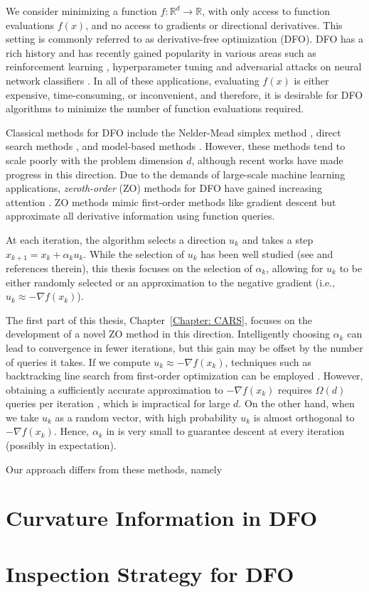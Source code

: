 We consider minimizing a function $f: \mathbb{R}^{d}\to \mathbb{R}$, with only access to function evaluations $f(x)$, and no access to gradients or directional derivatives. This setting is commonly referred to as derivative-free optimization (DFO). DFO has a rich history and has recently gained popularity in various areas such as reinforcement learning \cite{salimans2017evolution,mania2018simple,choromanski2020provably}, hyperparameter tuning \cite{bergstra2012random,hutter2019automated} and adversarial attacks on neural network classifiers \cite{chen2017zoo,cai2020zeroth}. In all of these applications, evaluating $f(x)$ is either expensive, time-consuming, or inconvenient, and therefore, it is desirable for DFO algorithms to minimize the number of function evaluations required.

Classical methods for DFO include the Nelder-Mead simplex method \cite{nelder1965simplex}, direct search methods \cite{kolda2003optimization}, and model-based methods \cite{conn2009introduction}. However, these methods tend to scale poorly with the problem dimension $d$, although recent works \cite{cartis2022scalable,cartis2022global,cartis2022dimensionality} have made progress in this direction. Due to the demands of large-scale machine learning applications, \textit{zeroth-order} (ZO) methods for DFO have gained increasing attention \cite{liu2020primer}. ZO methods mimic first-order methods like gradient descent but approximate all derivative information using function queries. 

At each iteration, the algorithm selects a direction $u_k$ and takes a step $x_{k+1} = x_k + \alpha_k u_k$. While the selection of $u_k$ has been well studied (see \cite{berahas2021theoretical} and references therein), this thesis focuses on the selection of $\alpha_k$, allowing for $u_k$ to be either randomly selected or an approximation to the negative gradient (i.e., $u_k \approx -\nabla f(x_k)$).

The first part of this thesis, Chapter~\ref{Chapter: CARS}, focuses on the development of a novel ZO method in this direction.
Intelligently choosing $\alpha_k$ can lead to convergence in fewer iterations, but this gain may be offset by the number of queries it takes. If we compute $u_k \approx -\nabla f(x_k)$, techniques such as backtracking line search from first-order optimization can be employed \cite{berahas2021global}. However, obtaining a sufficiently accurate approximation to $-\nabla f(x_k)$ requires $\Omega(d)$ queries per iteration \cite{berahas2021theoretical}, which is impractical for large $d$. On the other hand, when we take $u_k$ as a random vector, with high probability $u_k$ is almost orthogonal to $-\nabla f(x_k)$. Hence, $\alpha_k$ in \cite{ghadimi2013stochastic,nesterov2017random,bergou2020stochastic} is very small to guarantee descent at every iteration (possibly in expectation).

Our approach differs from these methods, namely 

\section{Curvature Information in DFO}

\section{Inspection Strategy for DFO}
